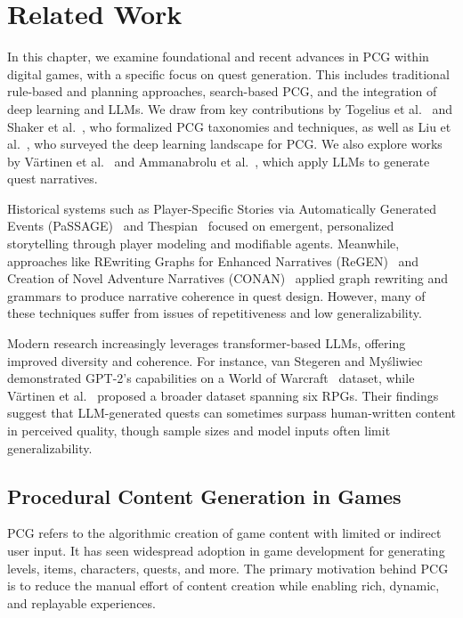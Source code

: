 \clearpage

\chapter{Related Work}

In this chapter, we examine foundational and recent advances in PCG within digital
games, with a specific focus on quest generation. This includes traditional rule-based
and planning approaches, search-based PCG, and the integration of deep learning and
LLMs. We draw from key contributions by Togelius et al.~\cite{togelius2011search} and Shaker et al.~\cite{shaker2016procedural},
who formalized PCG taxonomies and techniques, as well as Liu et al.~\cite{liu2021deep}, who surveyed
the deep learning landscape for PCG. We also explore works by V{\"a}rtinen et al.~\cite{vartinen2022generating} and
Ammanabrolu et al.~\cite{ammanabrolu2019toward}, which apply LLMs to generate quest narratives.

Historical systems such as Player-Specific Stories via Automatically Generated Events
(PaSSAGE)~\cite{thue2007interactive} and Thespian~\cite{si2005thespian} focused on emergent, personalized storytelling through
player modeling and modifiable agents. Meanwhile, approaches like REwriting Graphs
for Enhanced Narratives (ReGEN)~\cite{kerr2009supporting} and Creation of Novel Adventure Narratives (CONAN)~\cite{breault2021let}
applied graph rewriting and grammars to produce narrative coherence in quest
design. However, many of these techniques suffer from issues of repetitiveness and low
generalizability.

Modern research increasingly leverages transformer-based LLMs, offering improved
diversity and coherence. For instance, van Stegeren and My{\'s}liwiec~\cite{van2021fine} demonstrated
GPT-2's capabilities on a World of Warcraft~\cite{worldofwarcraft} dataset, while V{\"a}rtinen et al.~\cite{vartinen2022generating} proposed
a broader dataset spanning six RPGs. Their findings suggest that LLM-generated
quests can sometimes surpass human-written content in perceived quality, though sample
sizes and model inputs often limit generalizability.

\section{Procedural Content Generation in Games}

PCG refers to the algorithmic creation of game content with limited or indirect user
input. It has seen widespread adoption in game development for generating levels, items,
characters, quests, and more. The primary motivation behind PCG is to reduce the
manual effort of content creation while enabling rich, dynamic, and replayable experiences.

